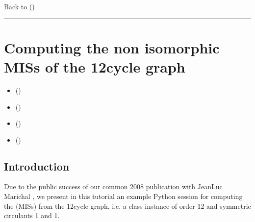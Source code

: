 \documentclass[a4paper,12pt,english]{sphinxhowto}
\begin{document}
Back to {\hyperref[\detokenize{tutorial:tutorial-label}]{}} ()


\bigskip\hrule\bigskip



\section{Computing the non isomorphic MISs of the 12\sphinxhyphen{}cycle graph}
\label{\detokenize{tutorial:computing-the-non-isomorphic-miss-of-the-12-cycle-graph}}\label{\detokenize{tutorial:isomorphicmis-tutorial-label}}
\begin{sphinxShadowBox}
\begin{itemize}
\item {} 
\label{\detokenize{tutorial:id306}}{\hyperref[\detokenize{tutorial:id110}]{}} ()

\item {} 
\label{\detokenize{tutorial:id307}}{\hyperref[\detokenize{tutorial:computing-the-maximal-independent-sets-miss}]{}} ()

\item {} 
\label{\detokenize{tutorial:id308}}{\hyperref[\detokenize{tutorial:computing-the-automorphism-group}]{}} ()

\item {} 
\label{\detokenize{tutorial:id309}}{\hyperref[\detokenize{tutorial:computing-the-isomorphic-miss}]{}} ()

\end{itemize}
\end{sphinxShadowBox}


\subsection{Introduction}
\label{\detokenize{tutorial:id110}}
Due to the public success of our common 2008 publication with Jean\sphinxhyphen{}Luc Marichal  , we present in this tutorial an example Python session for computing the  (MISs) from the 12\sphinxhyphen{}cycle graph, i.e. a  class instance of order 12 and symmetric circulants 1 and \sphinxhyphen{}1.
\end{document}
